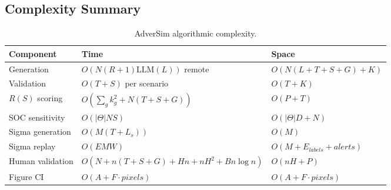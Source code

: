 \subsection{Complexity Summary}

\begin{table}[t]
\centering
\caption{AdverSim algorithmic complexity.}
\begin{tabular}{lll}
\hline
Component & Time & Space \\
\hline
Generation & $O(N(R+1)\mathrm{LLM}(L))$ remote & $O(N(L+T+S+G)+K)$ \\
Validation & $O(T+S)$ per scenario & $O(T+K)$ \\
$R(S)$ scoring & $O(\sum_g k_g^2 + N(T+S+G))$ & $O(P+T)$ \\
SOC sensitivity & $O(|\Theta|NS)$ & $O(|\Theta|D+N)$ \\
Sigma generation & $O(M(T+L_s))$ & $O(M)$ \\
Sigma replay & $O(EMW)$ & $O(M+E_{labels}+alerts)$ \\
Human validation & $O(N+n(T+S+G)+Hn+nH^2+Bn\log n)$ & $O(nH+P)$ \\
Figure CI & $O(A+F\cdot pixels)$ & $O(A+F\cdot pixels)$ \\
\hline
\end{tabular}
\end{table}
